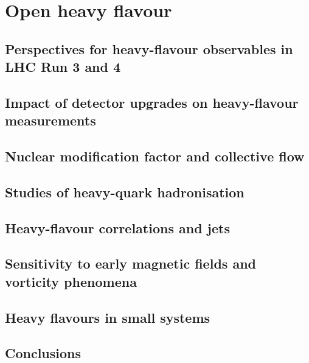 \documentclass[../report.tex]{subfiles}
\providecommand{\main}{..}
\begin{document}
\section{Open heavy flavour}
\label{sec:HI_HF}


\subsection{Perspectives for heavy-flavour observables in LHC Run 3 and 4}


\subsection{Impact of detector upgrades on heavy-flavour measurements}


\subsection{Nuclear modification factor and collective flow}


\subsection{Studies of heavy-quark hadronisation}


\subsection{Heavy-flavour correlations and jets}


\subsection{Sensitivity to early magnetic fields and vorticity phenomena}



\subsection{Heavy flavours in small systems}



\subsection{Conclusions}

\end{document}
